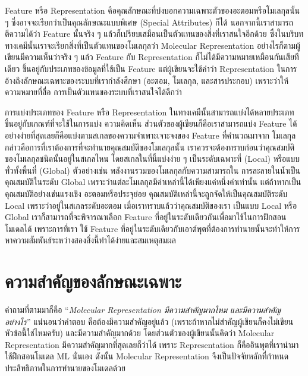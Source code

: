 Feature หรือ Representation คือคุณลักษณะที่บ่งบอกความเฉพาะตัวของอะตอมหรือโมเลกุลนั้น ๆ ซึ่งอาจจะเรียกว่าเป็นคุณลักษณะแบบพิเศษ 
(Special Attributes) ก็ได้ นอกจากนี้เราสามารถตีความได้ว่า Feature นั้นจริง ๆ แล้วก็เปรียบเสมือนเป็นตัวแทนของสิ่งที่เราสนใจอีกด้วย 
ซึ่งในบริบททางเคมีนั้นเราจะเรียกสิ่งที่เป็นตัวแทนของโมเลกุลว่า Molecular Representation อย่างไรก็ตามผู้เขียนมีความเห็นว่าจริง ๆ แล้ว 
Feature กับ Representation ก็ไม่ได้มีความหมายเหมือนกันเสียทีเดียว ขึ้นอยู่กับประเภทของข้อมูลที่ใช้เป็น Feature แต่ผู้เขียนจะใช้คำว่า 
Representation ในการอ้างถึงลักษณะเฉพาะของระบบที่เรากำลังศึกษา (อะตอม, โมเลกุล, และสารประกอบ) เพราะว่าให้ความหมายที่สื่อ%
การเป็นตัวแทนของระบบที่เราสนใจได้ดีกว่า\autocite{stepisnik2021}

การแบ่งประเภทของ Feature หรือ Representation ในทางเคมีนั้นสามารถแบ่งได้หลายประเภท ขึ้นอยู่กับเกณฑ์ที่จะใช้ในการแบ่ง ความคิดเห็น%
ส่วนตัวของผู้เขียนก็คือเราสามารถแบ่ง Feature ได้อย่างง่ายที่สุดเลยก็คือแบ่งตามสเกลของความจำเพาะเจาะจงของ Feature ที่คำนวณมาจาก%
โมเลกุล กล่าวคือการที่เราต้องการที่จะทำนายคุณสมบัติของโมเลกุลนั้น เราควรจะต้องทราบก่อนว่าคุณสมบัติของโมเลกุลชนิดนั้นอยู่ในสเกลไหน 
โดยสเกลในที่นี้แบ่งง่าย ๆ เป็นระดับเฉพาะที่ (Local) หรือแบบทั่วทั้งพื้นที่ (Global) ตัวอย่างเช่น พลังงานรวมของโมเลกุลกับความสามารถใน%
การละลายในน้ำเป็นคุณสมบัติในระดับ Global เพราะว่าแต่ละโมเลกุลมีค่าเหล่านี้ได้เพียงแค่หนึ่งค่าเท่านั้น แต่ถ้าหากเป็นคุณสมบัติอย่างเช่นแรงเชิง%
อะตอมหรือประจุย่อย คุณสมบัติเหล่านี้จะถูกจัดให้เป็นคุณสมบัติระดับ Local เพราะว่าอยู่ในสเกลระดับอะตอม เมื่อเราทราบแล้วว่าคุณสมบัติของเรา%
เป็นแบบ Local หรือ Global เราก็สามารถที่จะพิจารณาเลือก Feature ที่อยู่ในระดับเดียวกันเพื่อมาใช้ในการฝึกสอนโมเดลได้ เพราะการที่เรา%
ใช้ Feature ที่อยู่ในระดับเดียวกับเอาต์พุตที่ต้องการทำนายนั้นจะทำให้การหาความสัมพันธ์ระหว่างสองสิ่งนี้ทำได้ง่ายและสมเหตุสมผล

\section{ความสำคัญของลักษณะเฉพาะ}
\label{sec:why_feature}

คำถามที่ตามมาก็คือ \enquote{\textit{Molecular Representation มีความสำคัญมากไหม และมีความสำคัญอย่างไร}} แน่นอนว่าคำตอบ%
คือต้องมีความสำคัญอยู่แล้ว (เพราะถ้าหากไม่สำคัญผู้เขียนก็คงไม่เขียนหัวข้อนี้ใช่ไหมครับ) และมีความสำคัญมากด้วย โดยส่วนตัวของผู้เขียนนั้นคิดว่า
Molecular Representation มีความสำคัญมากที่สุดเลยก็ว่าได้ เพราะ Representation ก็คืออินพุตที่เรานำมาใช้ฝึกสอนโมเดล ML นั่นเอง 
ดังนั้น Molecular Representation จึงเป็นปัจจัยหลักที่กำหนดประสิทธิภาพในการทำนายของโมเดลด้วย 

